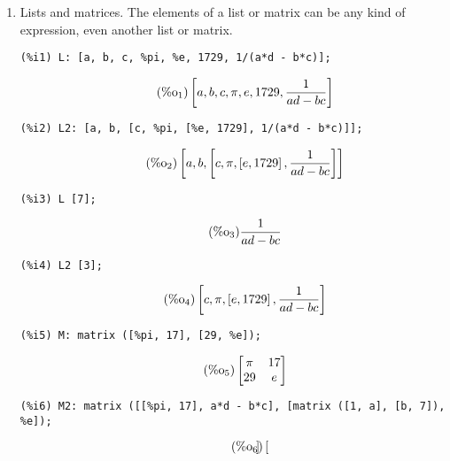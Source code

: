 \documentclass[12pt,leqno]{article}
\begin{document}
\begin{enumerate}
\item Lists and matrices.
The elements of a list or matrix can be any kind of expression,
even another list or matrix.
\begin{verbatim}
(%i1) L: [a, b, c, %pi, %e, 1729, 1/(a*d - b*c)];
\end{verbatim}
\begin{equation}
\tag{$\mathop{\mathrm{\%o}}_{1}$}\left[a, b, c, \pi, e, 1729, \frac{1}{a d-b c}\right]
\label{eq:doc-group1-code8-1-1}
\end{equation}
\begin{verbatim}
(%i2) L2: [a, b, [c, %pi, [%e, 1729], 1/(a*d - b*c)]];
\end{verbatim}
\begin{equation}
\tag{$\mathop{\mathrm{\%o}}_{2}$}\left[a, b, \left[c, \pi, \left[e, 1729\right], \frac{1}{a d-b c}\right]\right]
\label{eq:doc-group1-code8-2-1}
\end{equation}
\begin{verbatim}
(%i3) L [7];
\end{verbatim}
\begin{equation}
\tag{$\mathop{\mathrm{\%o}}_{3}$}\frac{1}{a d-b c}
\label{eq:doc-group1-code8-3-1}
\end{equation}
\begin{verbatim}
(%i4) L2 [3];
\end{verbatim}
\begin{equation}
\tag{$\mathop{\mathrm{\%o}}_{4}$}\left[c, \pi, \left[e, 1729\right], \frac{1}{a d-b c}\right]
\label{eq:doc-group1-code8-4-1}
\end{equation}
\begin{verbatim}
(%i5) M: matrix ([%pi, 17], [29, %e]);
\end{verbatim}
\begin{equation}
\tag{$\mathop{\mathrm{\%o}}_{5}$}\begin{bmatrix}
\pi & 17\\
29 & e\\
\end{bmatrix}
\label{eq:doc-group1-code8-5-1}
\end{equation}
\begin{verbatim}
(%i6) M2: matrix ([[%pi, 17], a*d - b*c], [matrix ([1, a], [b, 7]), %e]);
\end{verbatim}
\begin{equation}
\tag{$\mathop{\mathrm{\%o}}_{6}$}\begin{bmatrix}

\end{bmatrix}
\end{equation}
\end{enumerate}
\end{document}
